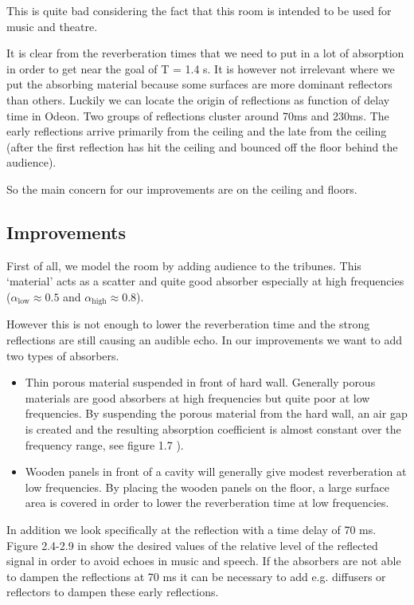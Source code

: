 This is quite bad considering the fact that this room is intended to be used for music and theatre. 

It is clear from the reverberation times that we need to put in a lot of absorption in order to get near the goal of T = 1.4 s. It is however not irrelevant where we put the absorbing material because some surfaces are more dominant reflectors than others. Luckily we can locate the origin of reflections as function of delay time in Odeon. Two groups of reflections cluster around 70ms and 230ms. The early reflections arrive primarily from the ceiling and the late from the ceiling (after the first reflection has hit the ceiling and bounced off the floor behind the audience). 

So the main concern for our improvements are on the ceiling and floors. 
\subsection{Improvements}
First of all, we model the room by adding audience to the tribunes. This `material' acts as a scatter and quite good absorber especially at high frequencies ($\alpha_{\text{low}}\approx 0.5$ and $\alpha_{\text{high}}\approx 0.8$).

However this is not enough to lower the reverberation time and the strong reflections are still causing an audible echo. In our improvements we want to add two types of absorbers. 
\begin{itemize}
\item Thin porous material suspended in front of hard wall. Generally porous materials are good absorbers at high frequencies but quite poor at low frequencies. By suspending the porous material from the hard wall, an air gap is created and the resulting absorption coefficient is almost constant over the frequency range, see figure 1.7 \cite[p. 10]{Rindel1981absorbers}).
\item Wooden panels in front of a cavity will generally give modest reverberation at low frequencies. By placing the wooden panels on the floor, a large surface area is covered in order to lower the reverberation time at low frequencies.
\end{itemize}
In addition we look specifically at the reflection with a time delay of 70 ms. Figure 2.4-2.9 in \cite[pp. 8-11]{Gade2003room} show the desired values of the relative level of the reflected signal in order to avoid echoes in music and speech. If the absorbers are not able to dampen the reflections at 70 ms it can be necessary to add e.g. diffusers or reflectors to dampen these early reflections.

